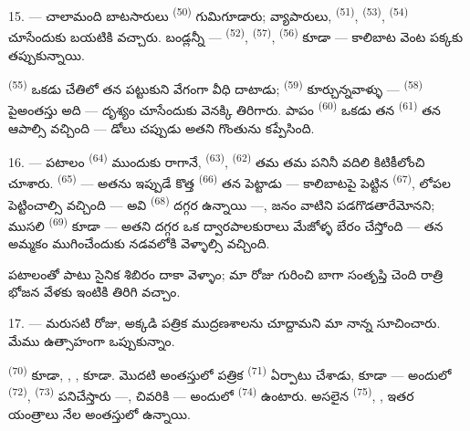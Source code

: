 15. --- చాలామంది బాటసారులు  \textsuperscript{(50)} గుమిగూడారు; వ్యాపారులు,
 \textsuperscript{(51)}, 
\textsuperscript{(53)},  \textsuperscript{(54)}
 చూసేందుకు బయటికి వచ్చారు. బండ్లన్నీ — 
\textsuperscript{(52)},  \textsuperscript{(57)},
 \textsuperscript{(56)} కూడా — కాలిబాట వెంట పక్కకు
తప్పుకున్నాయి.

\VUsaut{3.0mm}

 \textsuperscript{(55)} ఒకడు చేతిలో తన
 పట్టుకుని వేగంగా వీధి దాటాడు; 
\textsuperscript{(59)} కూర్చున్నవాళ్ళు —  \textsuperscript{(58)}
పైఅంతస్తు అది — దృశ్యం చూసేందుకు వెనక్కి తిరిగారు. పాపం 
\textsuperscript{(60)} ఒకడు తన  \textsuperscript{(61)} తన
 ఆపాల్సి వచ్చింది — డోలు చప్పుడు అతని గొంతును కప్పేసింది.

16. --- పటాలం  \textsuperscript{(64)} ముందుకు రాగానే,
 \textsuperscript{(63)},  \textsuperscript{(62)}
తమ  తమ పనినీ వదిలి కిటికీలోంచి చూశారు. 
\textsuperscript{(65)} — అతను ఇప్పుడే కొత్త  \textsuperscript{(66)} తన
 పెట్టాడు — కాలిబాటపై పెట్టిన 
\textsuperscript{(67)},  లోపల పెట్టించాల్సి వచ్చింది — అవి
 \textsuperscript{(68)} దగ్గర ఉన్నాయి —, జనం వాటిని
పడగొడతారేమోనని; ముసలి  \textsuperscript{(69)} కూడా — అతని
దగ్గర ఒక ద్వారపాలకురాలు మేజోళ్ళ బేరం చేస్తోంది — తన అమ్మకం ముగించేందుకు నడవలోకి
వెళ్ళాల్సి వచ్చింది.

పటాలంతో పాటు సైనిక శిబిరం దాకా వెళ్ళాం; మా రోజు గురించి బాగా సంతృప్తి చెంది రాత్రి భోజన
వేళకు ఇంటికి తిరిగి వచ్చాం.

\VUsaut{3.0mm}

17. --- మరుసటి రోజు, అక్కడి పత్రిక ముద్రణశాలను చూద్దామని మా నాన్న సూచించారు. మేము
ఉత్సాహంగా ఒప్పుకున్నాం.

  \textsuperscript{(70)}
 కూడా, ,
,  కూడా. మొదటి అంతస్తులో పత్రిక
 \textsuperscript{(71)} ఏర్పాటు చేశాడు,
 కూడా — అందులో  \textsuperscript{(72)},
 \textsuperscript{(73)} పనిచేస్తారు —, చివరికి
 — అందులో  \textsuperscript{(74)}
ఉంటారు. అసలైన  \textsuperscript{(75)}, , ఇతర
యంత్రాలు నేల అంతస్తులో ఉన్నాయి.

